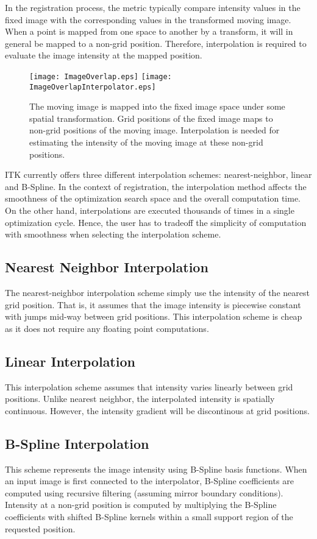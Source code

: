 In the registration process, the metric typically compare intensity values 
in the fixed image with the corresponding values in the transformed moving
image. When a point is mapped from one space to another by a transform,
it will in general be mapped to a non-grid position. Therefore, interpolation
is required to evaluate the image intensity at the mapped position.

\begin{figure}
\center
\texttt{[image: ImageOverlap.eps]}
\texttt{[image: ImageOverlapInterpolator.eps]}
\caption{ The moving image is mapped into the fixed image space under some spatial
transformation. Grid positions of the fixed image maps to non-grid positions of the
moving image. Interpolation is needed for estimating the intensity of the
moving image at these non-grid positions.}
\label{fig:ImageOverlapInterpolator}
\end{figure}

ITK currently offers three different interpolation schemes: nearest-neighbor,
linear and B-Spline. In the context of registration, the interpolation method
affects the smoothness of the optimization search space and the overall
computation time. On the other hand, interpolations are executed thousands of
times in a single optimization cycle. Hence, the user has to tradeoff the
simplicity of computation with smoothness when selecting the interpolation 
scheme.
 
\subsection{Nearest Neighbor Interpolation}
\label{sec:NearestNeighborInterpolation}
The nearest-neighbor interpolation scheme simply use the intensity of
the nearest grid position. That is, it assumes that the image intensity
is piecewise constant with jumps mid-way between grid positions. 
This interpolation scheme is cheap as it does not require any 
floating point computations.

\subsection{Linear Interpolation}
\label{sec:LinearInterpolation}
This interpolation scheme assumes that intensity varies linearly
between grid positions. Unlike nearest neighbor, the interpolated
intensity is spatially continuous. However, the intensity gradient
will be discontinous at grid positions.

\subsection{B-Spline Interpolation}
\label{sec:BSplineInterpolation}
This scheme represents the image intensity using B-Spline basis functions.
When an input image is first connected to the interpolator, B-Spline 
coefficients are computed using recursive filtering (assuming mirror
boundary conditions). Intensity at a non-grid position is computed
by multiplying the B-Spline coefficients with shifted B-Spline kernels
within a small support region of the requested position.

